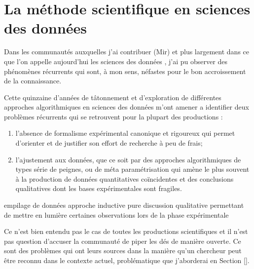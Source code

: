\chapter{La méthode scientifique en sciences des données} \label{sec:methode}


Dans les communautés auxquelles j'ai contribuer (Mir) et plus largement dans ce que l'on appelle aujourd'hui \og les sciences des données \fg, j'ai pu observer des phénomènes récurrents qui sont, à mon sens, néfastes pour le bon accroissement de la connaissance.

Cette quinzaine d'années de tâtonnement et d'exploration de différentes approches algorithmiques en sciences des données m'ont amener a identifier deux problèmes récurrents qui se retrouvent pour la plupart des productions :
\begin{enumerate}
  \item l'absence de formalisme expérimental canonique et rigoureux qui permet d'orienter et de justifier son effort de recherche à peu de frais;
  \item l'ajustement aux données, que ce soit par des approches algorithmiques de types série de peignes, ou de méta paramétrisation qui amène le plus souvent à la production de données quantitatives coïncidentes et des conclusions qualitatives dont les bases expérimentales sont fragiles.
\end{enumerate}

empilage de données
approche inductive pure
discussion qualitative permettant de mettre en lumière certaines observations lors de la phase expérimentale


Ce n'est bien entendu pas le cas de toutes les productions scientifiques et il n'est pas question d'accuser la communauté de \og piper les dés \fg de manière ouverte. Ce sont des problèmes qui ont leurs sources dans la manière qu'un chercheur peut être reconnu dans le contexte actuel, problématique que j'aborderai en Section \ref{}.

